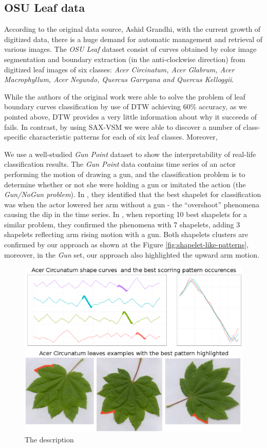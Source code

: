\documentclass{llncs}
\begin{document}
\subsection{OSU Leaf data}
According to the original data source, Ashid Grandhi, with the current growth of digitized data,
there is a huge demand for automatic management and retrieval of various images. The \textit{OSU
Leaf} dataset consist of curves obtained by color image segmentation and boundary extraction (in the
anti-clockwise direction) from digitized leaf images of six classes: \textit{Acer Circinatum, Acer
Glabrum, Acer Macrophyllum, Acer Negundo, Quercus Garryana and Quercus Kelloggii}.

While the authors of the original work were able to solve the problem of leaf boundary curves
classification by use of DTW achieving 60\% accuracy, as we pointed above, DTW provides a very
little information about why it succeeds of fails. In contrast, by using SAX-VSM we were able to
discover a number of class-specific characteristic patterns for each of six leaf classes. Moreover, 



We use a well-studied \textit{Gun Point} dataset to show the interpretability of real-life
classification results. The \textit{Gun Point} data contains time series of an actor performing the
motion of drawing a gun, and the classification problem is to determine whether or not she were
holding a gun or imitated the action (the \textit{Gun/NoGun problem}). In \cite{shapelet}, they
identified that the best shapelet for classification was when the actor lowered her arm without a
gun - the ``overshoot'' phenomena causing the dip in the time series. In \cite{bagnal}, when
reporting 10 best shapelets for a similar problem, they confirmed the phenomena with 7 shapelets,
adding 3 shapelets reflecting arm rising motion with a gun. Both shapelets clusters are confirmed by
our approach as shown at the Figure \ref{fig:shapelet-like-patterns}, moreover, in the \textit{Gun}
set, our approach also highlighted the upward arm motion.
\begin{figure}[tbp]
   \centering
   \includegraphics[width=130mm]{figures/AcerCircunatum.eps}
   \caption{The description}
   \label{fig:shapelet-acer-patterns}
\end{figure}
\end{document}
